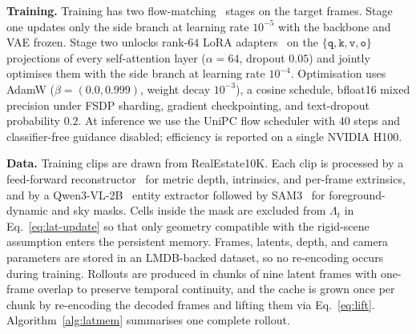 \documentclass{llmxive}
\providecommand{\boldstart}[1]{\vspace{0.1in}\noindent\textbf{#1}}
\begin{document}
\boldstart{Training.}
Training has two flow-matching~\cite{lipman2022flow} stages on the target frames.
Stage one updates only the side branch at learning rate $10^{-5}$ with the backbone and VAE frozen.
Stage two unlocks rank-$64$ LoRA adapters~\cite{hu2021lora} on the $\{\texttt{q}, \texttt{k}, \texttt{v}, \texttt{o}\}$ projections of every self-attention layer ($\alpha = 64$, dropout $0.05$) and jointly optimises them with the side branch at learning rate $10^{-4}$.
Optimisation uses AdamW ($\beta = (0.0, 0.999)$, weight decay $10^{-3}$), a cosine schedule, bfloat16 mixed precision under FSDP sharding, gradient checkpointing, and text-dropout probability $0.2$.
At inference we use the UniPC flow scheduler with $40$ steps and classifier-free guidance disabled; efficiency is reported on a single NVIDIA H100.

\boldstart{Data.}
Training clips are drawn from RealEstate10K.
Each clip is processed by a feed-forward reconstructor~\cite{lin2025depth} for metric depth, intrinsics, and per-frame extrinsics, and by a Qwen3-VL-2B~\cite{yang2025qwen3} entity extractor followed by SAM3~\cite{carion2025sam3segmentconcepts} for foreground-dynamic and sky masks.
Cells inside the mask are excluded from $\Lambda_t$ in Eq.~\ref{eq:lat-update} so that only geometry compatible with the rigid-scene assumption enters the persistent memory.
Frames, latents, depth, and camera parameters are stored in an LMDB-backed dataset, so no re-encoding occurs during training.
Rollouts are produced in chunks of nine latent frames with one-frame overlap to preserve temporal continuity, and the cache is grown once per chunk by re-encoding the decoded frames and lifting them via Eq.~\ref{eq:lift}.
Algorithm~\ref{alg:latmem} summarises one complete rollout.
\end{document}
